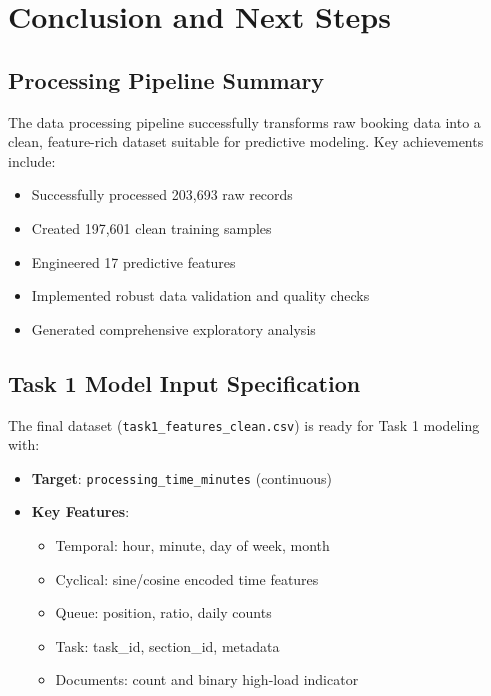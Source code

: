 \documentclass[12pt,a4paper]{article}
\begin{document}
\section{Conclusion and Next Steps}

\subsection{Processing Pipeline Summary}

The data processing pipeline successfully transforms raw booking data into a clean, feature-rich dataset suitable for predictive modeling. Key achievements include:

\begin{itemize}
    \item Successfully processed 203,693 raw records
    \item Created 197,601 clean training samples
    \item Engineered 17 predictive features
    \item Implemented robust data validation and quality checks
    \item Generated comprehensive exploratory analysis
\end{itemize}

\subsection{Task 1 Model Input Specification}

The final dataset (\texttt{task1\_features\_clean.csv}) is ready for Task 1 modeling with:

\begin{itemize}
    \item \textbf{Target}: \texttt{processing\_time\_minutes} (continuous)
    \item \textbf{Key Features}: 
        \begin{itemize}
            \item Temporal: hour, minute, day of week, month
            \item Cyclical: sine/cosine encoded time features
            \item Queue: position, ratio, daily counts
            \item Task: task\_id, section\_id, metadata
            \item Documents: count and binary high-load indicator
        \end{itemize}
\end{itemize}
\end{document}
